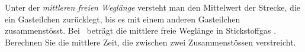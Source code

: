 Unter der \emph{mittleren freien Weglänge} versteht man den Mittelwert der Strecke, die ein Gasteilchen zurücklegt, bis es mit einem anderen Gasteilchen zusammenstösst. Bei \thSO\ beträgt die mittlere freie Weglänge in Stickstoffgas \lamO. Berechnen Sie die mittlere Zeit, die zwischen zwei Zusammenstössen verstreicht.
